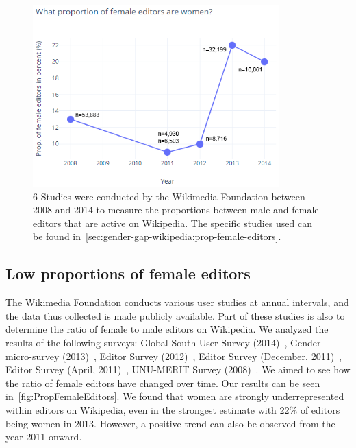 \documentclass[a4paper, 11pt]{article}
\begin{document}
\begin{figure}[t]
	\centering
	\includegraphics[width=0.85\textwidth]{figures/PropFemaleEditors.png}
\caption{6 Studies were conducted by the Wikimedia Foundation between 2008 and 2014 to measure the proportions between male and female editors that are active on Wikipedia. The specific studies used can be found in~\autoref{sec:gender-gap-wikipedia:prop-female-editors}.} \label{fig:PropFemaleEditors}
\end{figure}

\subsection{Low proportions of female editors} \label{sec:gender-gap-wikipedia:prop-female-editors}
The Wikimedia Foundation conducts various user studies at annual intervals, and the data thus collected is made publicly available. Part of these studies is also to determine the ratio of female to male editors on Wikipedia. We analyzed the results of the following surveys: Global South User Survey (2014)~\cite{shammaa2014}, Gender micro-survey (2013)~\cite{fung2013}, Editor Survey (2012)~\cite{tilman2012}, Editor Survey (December, 2011)~\cite{pande2011}, Editor Survey (April, 2011)~\cite{khanna2011}, UNU-MERIT Survey (2008)~\cite{glott2010wikipedia}. We aimed to see how the ratio of female editors have changed over time. Our results can be seen in~\autoref{fig:PropFemaleEditors}. We found that women are strongly underrepresented within editors on Wikipedia, even in the strongest estimate with 22\% of editors being women in 2013. However, a positive trend can also be observed from the year 2011 onward.
\end{document}
